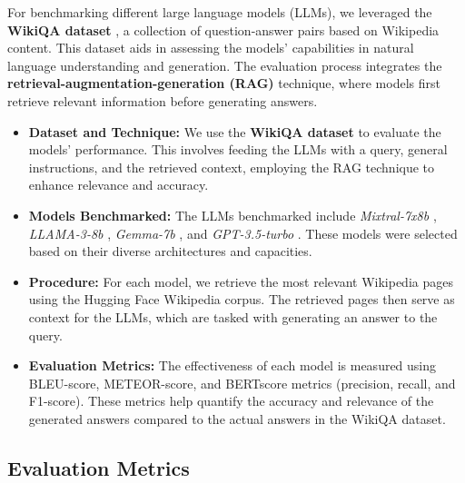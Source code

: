 \documentclass[sigconf,natbib=true,anonymous=false]{acmart}
\begin{document}
For benchmarking different large language models (LLMs), we leveraged the \textbf{WikiQA dataset} \cite{yang-etal-2015-wikiqa}, a collection of question-answer pairs based on Wikipedia content. This dataset aids in assessing the models' capabilities in natural language understanding and generation. The evaluation process integrates the \textbf{retrieval-augmentation-generation (RAG)} technique, where models first retrieve relevant information before generating answers.

\begin{itemize}
    \item \textbf{Dataset and Technique:} We use the \textbf{WikiQA dataset} \cite{yang-etal-2015-wikiqa} to evaluate the models' performance. This involves feeding the LLMs with a query, general instructions, and the retrieved context, employing the RAG technique to enhance relevance and accuracy.
    \item \textbf{Models Benchmarked:} The LLMs benchmarked include \emph{Mixtral-7x8b} \cite{jiang2024mixtral}, \emph{LLAMA-3-8b} \cite{touvron2023llama}, \emph{Gemma-7b} \cite{gemmateam2024gemma}, and \emph{GPT-3.5-turbo} \cite{brown2020language}. These models were selected based on their diverse architectures and capacities.
    \item \textbf{Procedure:} For each model, we retrieve the most relevant Wikipedia pages using the Hugging Face Wikipedia corpus. The retrieved pages then serve as context for the LLMs, which are tasked with generating an answer to the query.
    \item \textbf{Evaluation Metrics:} The effectiveness of each model is measured using BLEU-score, METEOR-score, and BERTscore metrics (precision, recall, and F1-score). These metrics help quantify the accuracy and relevance of the generated answers compared to the actual answers in the WikiQA dataset.
\end{itemize}



\subsection{Evaluation Metrics}
\end{document}
